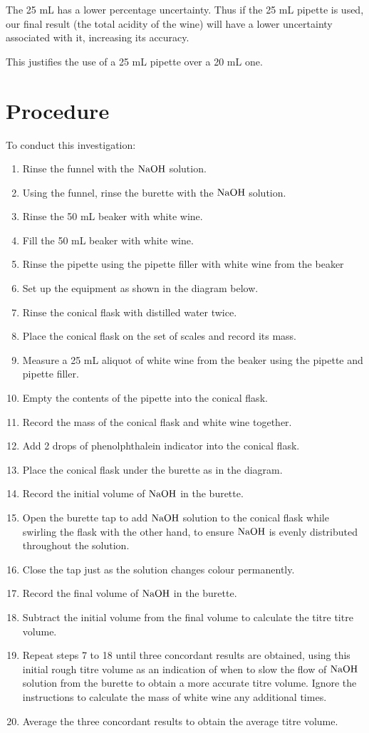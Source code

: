 \documentclass[a4paper,11pt]{article}
\begin{document}
The 25 mL has a lower percentage uncertainty. Thus if the 25 mL pipette is
used, our final result (the total acidity of the wine) will have a lower
uncertainty associated with it, increasing its accuracy.

This justifies the use of a 25 mL pipette over a 20 mL one.


\section{Procedure}

To conduct this investigation:

\begin{enumerate}
\item Rinse the funnel with the $\ce{NaOH}$ solution.
\item Using the funnel, rinse the burette with the $\ce{NaOH}$ solution.
\item Rinse the 50 mL beaker with white wine.
\item Fill the 50 mL beaker with white wine.
\item Rinse the pipette using the pipette filler with white wine from the
	beaker
\item Set up the equipment as shown in the diagram below.
\item Rinse the conical flask with distilled water twice.
\item Place the conical flask on the set of scales and record its mass.
\item Measure a 25 mL aliquot of white wine from the beaker using the pipette
	and pipette filler.
\item Empty the contents of the pipette into the conical flask.
\item Record the mass of the conical flask and white wine together.
\item Add 2 drops of phenolphthalein indicator into the conical flask.
\item Place the conical flask under the burette as in the diagram.
\item Record the initial volume of $\ce{NaOH}$ in the burette.
\item Open the burette tap to add $\ce{NaOH}$ solution to the conical flask
	while swirling the flask with the other hand, to ensure $\ce{NaOH}$ is
	evenly distributed throughout the solution.
\item Close the tap just as the solution changes colour permanently.
\item Record the final volume of $\ce{NaOH}$ in the burette.
\item Subtract the initial volume from the final volume to calculate the titre
	titre volume.
\item Repeat steps 7 to 18 until three concordant results are obtained, using
	this initial rough titre volume as an indication of when to slow the flow
	of $\ce{NaOH}$ solution from the burette to obtain a more accurate titre
	volume. Ignore the instructions to calculate the mass of white wine any
	additional times.
\item Average the three concordant results to obtain the average titre volume.
\end{enumerate}
\end{document}

